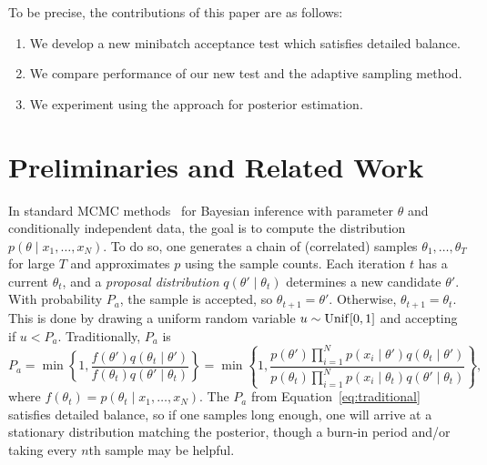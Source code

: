 \documentclass{article}
\begin{document}
To be precise, the contributions of this paper are as follows:

\begin{enumerate}[noitemsep]
    \item We develop a new minibatch acceptance test which satisfies detailed balance.
    \item We compare performance of our new test and the adaptive sampling method.
    \item We experiment using the approach for posterior estimation.
\end{enumerate}




\section{Preliminaries and Related Work}\label{sec:related_work}

In standard MCMC methods~\cite{gilks1996markov,brooks2011handbook} for Bayesian inference with
parameter $\theta$ and conditionally independent data, the goal is to compute the distribution
$p(\theta \mid x_1, \ldots, x_N)$.  To do so, one generates a chain of (correlated) samples
$\theta_1, \ldots, \theta_T$ for large $T$ and approximates $p$ using the sample counts.  Each
iteration $t$ has a current $\theta_t$, and a \emph{proposal distribution} $q(\theta' \mid
\theta_t)$ determines a new candidate $\theta'$. With probability $P_a$, the sample is accepted, so
$\theta_{t+1} = \theta'$. Otherwise, $\theta_{t+1} = \theta_t$. This is done by drawing a uniform
random variable $u \sim {\rm Unif}[0,1]$ and accepting if $u < P_a$. Traditionally, $P_a$ is
\begin{equation}\label{eq:traditional}
P_a = \min\left\{ 1, \frac{f(\theta')q(\theta_t \mid \theta')}{f(\theta_t)q(\theta' \mid \theta_t)}
\right\} = \min\left\{ 1, \frac{p(\theta')\prod_{i=1}^N p(x_i \mid \theta')q(\theta_t \mid
\theta')}{p(\theta_t)\prod_{i=1}^N p(x_i \mid \theta_t)q(\theta' \mid
\theta_t)} \right\},
\end{equation}
where $f(\theta_t)=p(\theta_t \mid x_1,\ldots,x_N)$. The $P_a$ from Equation~\ref{eq:traditional}
satisfies detailed balance, so if one samples long enough, one will arrive at a stationary
distribution matching the posterior, though a burn-in period and/or taking every $n$th sample may be
helpful.
\end{document}
